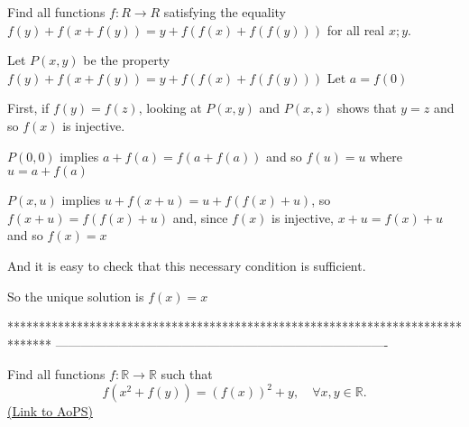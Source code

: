 \begin{solution}
	\begin{tcolorbox}Find all functions $ f : R\rightarrow R$ satisfying the equality $ f (y) + f (x + f (y)) = y + f (f (x) + f (f (y)))$ for all real $ x; y$.\end{tcolorbox}

Let $ P(x,y)$ be the property $ f (y) + f (x + f (y)) = y + f (f (x) + f (f (y)))$
Let $ a=f(0)$

First, if $ f(y)=f(z)$, looking at $ P(x,y)$ and $ P(x,z)$ shows that $ y=z$ and so $ f(x)$ is injective.

$ P(0,0)$ implies $ a + f (a) = f (a + f (a))$  and so $ f(u)=u$ where $ u=a+f(a)$

$ P(x,u)$ implies $ u + f (x + u) = u + f (f (x) + u)$, so $ f (x + u) =f (f (x) + u)$ and, since $ f(x)$ is injective, $ x+u=f(x)+u$ and so $ f(x)=x$

And it is easy to check that this necessary condition is sufficient.

So the unique solution is $ \boxed{f(x)=x}$
\end{solution}
*******************************************************************************
-------------------------------------------------------------------------------

\begin{problem}
	Find all functions $f: \mathbb R \to \mathbb R$ such that
\[f(x^2+f(y))=(f(x))^2+y, \quad \forall x,y \in \mathbb R.\]
	\flushright \href{https://artofproblemsolving.com/community/c6h185651}{(Link to AoPS)}
\end{problem}




